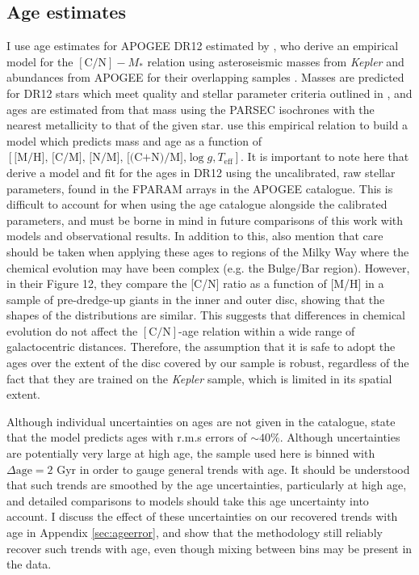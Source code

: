  \subsection{Age estimates}
 \label{sec:ages}
I use age estimates for APOGEE DR12 estimated by \citet{2016MNRAS.456.3655M}, who derive an empirical model for the $\mathrm{[C/N]} -M_*$ relation using asteroseismic masses from \emph{Kepler} and abundances from APOGEE for their overlapping samples \citep[APOKASC ][]{2014ApJS..215...19P}. Masses are predicted for DR12 stars which meet quality and stellar parameter criteria outlined in \citet{2016MNRAS.456.3655M}, and ages are estimated from that mass using the PARSEC isochrones with the nearest metallicity to that of the given star. \citet{2016MNRAS.456.3655M} use this empirical relation to build a model which predicts mass and age as a function of $[\text{[M/H], [C/M], [N/M], [(C+N)/M],}\log{g},T_{\mathrm{eff}}]$. It is important to note here that \citet{2016MNRAS.456.3655M} derive a model and fit for the ages in DR12 using the uncalibrated, raw stellar parameters, found in the FPARAM arrays in the APOGEE catalogue. This is difficult to account for when using the age catalogue alongside the calibrated parameters, and must be borne in mind in future comparisons of this work with models and observational results. In addition to this, \citet{2016MNRAS.456.3655M} also mention that care should be taken when applying these ages to regions of the Milky Way where the chemical evolution may have been complex (e.g. the Bulge/Bar region). However, in their Figure 12, they compare the [C/N] ratio as a function of [M/H] in a sample of pre-dredge-up giants in the inner and outer disc, showing that the shapes of the distributions are similar. This suggests that differences in chemical evolution do not affect the $\mathrm{[C/N]}$-age relation within a wide range of galactocentric distances. Therefore, the assumption that it is safe to adopt the \citet{2016MNRAS.456.3655M} ages over the extent of the disc covered by our sample is robust, regardless of the fact that they are trained on the \emph{Kepler} sample, which is limited in its spatial extent.

 Although individual uncertainties on ages are not given in the catalogue, \citet{2016MNRAS.456.3655M} state that the model predicts ages with r.m.s errors of $\sim 40\%$. Although uncertainties are potentially very large at high age, the sample used here is binned with $\Delta \text{age}= 2$ Gyr in order to gauge general trends with age. It should be understood that such trends are smoothed by the age uncertainties, particularly at high age, and detailed comparisons to models should take this age uncertainty into account. I discuss the effect of these uncertainties on our recovered trends with age in Appendix \ref{sec:ageerror}, and show that the methodology still reliably recover such trends with age, even though mixing between bins may be present in the data.

